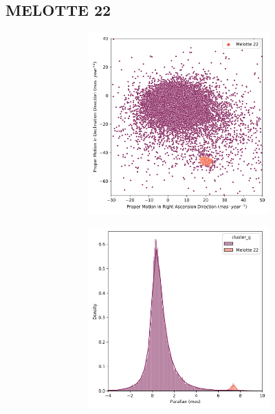 \documentclass[11pt,a4paper,english,twocolumn]{article}
\begin{document}
\subsection{MELOTTE 22}
\label{sec:melotte22}

\begin{figure}[htbp]
  \centering
  \begin{subfigure}{\columnwidth}
    \centering
    \begin{subfigure}[t]{0.30\textwidth}
      \centering
      \includegraphics[width=\textwidth]{../figures/melotte_22/pm_melotte_22.png}
    \end{subfigure}
    \hfill
    \begin{subfigure}[t]{0.30\textwidth}
      \centering
      \includegraphics[width=\textwidth]{../figures/melotte_22/parallax_melotte_22.png}

\end{subfigure}
\end{subfigure}
\end{figure}
\end{document}
